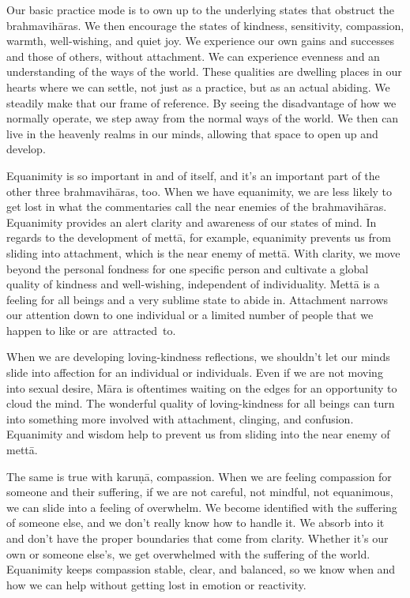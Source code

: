 Our basic practice mode is to own up to the underlying states that obstruct the brahmavihāras. We then encourage the states of kindness, sensitivity, \mbox{compassion}, warmth, well-wishing, and quiet joy. We experience our own gains and successes and those of others, without attachment. We can experience evenness and an understanding of the ways of the world. These qualities are dwelling places in our hearts where we can settle, not just as a practice, but as an actual abiding. We steadily make that our frame of reference. By seeing the disadvantage of how we normally operate, we step away from the normal ways of the world. We then can live in the heavenly realms in our minds, allowing that space to open up and develop.

Equanimity is so important in and of itself, and it's an important part of the other three brahmavihāras, too. When we have equanimity, we are less likely to get lost in what the commentaries call the near enemies of the brahmavihāras. Equanimity provides an alert clarity and awareness of our states of mind. In regards to the development of mettā, for example, equanimity prevents us from sliding into attachment, which is the near enemy of mettā. With clarity, we move beyond \linebreak the personal fondness for one specific person and cultivate a global quality of kindness and well-wishing, independent of individuality. Mettā is a feeling for all beings and a very sublime state to abide in. Attachment narrows our attention down to one individual or a limited number of people that we happen to like or \mbox{are attracted to.}

When we are developing loving-kindness reflections, we shouldn't let our minds slide into affection for an individual or individuals. Even if we are not moving into sexual desire, Māra is oftentimes waiting on the edges for an opportunity to cloud the mind. The wonderful quality of loving-kindness for all beings can turn into something more involved with attachment, clinging, and confusion. Equanimity and wisdom help to prevent us from sliding into the near enemy of mettā.

The same is true with karuṇā, compassion. When we are feeling compassion for someone and their suffering, if we are not careful, not mindful, not equanimous, we can slide into a feeling of overwhelm. We become identified with the suffering of someone else, and we don't really know how to handle it. We absorb into it and don't have the proper boundaries that come from clarity. Whether it's our own or someone else's, we get overwhelmed with the suffering of the world. Equanimity keeps compassion stable, clear, and balanced, so we know when and how we can help without getting lost in emotion or reactivity.


